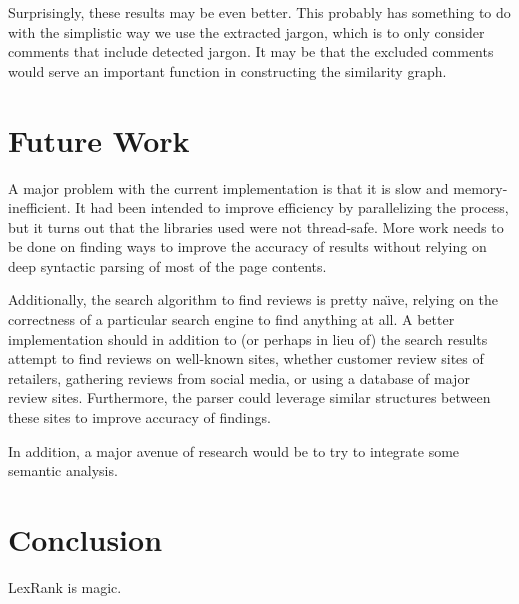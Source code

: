\documentclass{article}
\begin{document}
Surprisingly, these results may be even better. This probably has something to
do with the simplistic way we use the extracted jargon, which is to only
consider comments that include detected jargon. It may be that the excluded
comments would serve an important function in constructing the similarity
graph.

\section{Future Work}

A major problem with the current implementation is that it is slow and memory-
inefficient. It had been intended to improve efficiency by parallelizing the
process, but it turns out that the libraries used were not thread-safe. More
work needs to be done on finding ways to improve the accuracy of results
without relying on deep syntactic parsing of most of the page contents.

Additionally, the search algorithm to find reviews is pretty na\"{\i}ve,
relying on the correctness of a particular search engine to find anything at
all. A better implementation should in addition to (or perhaps in lieu of) the
search results attempt to find reviews on well-known sites, whether customer
review sites of retailers, gathering reviews from social media, or using a
database of major review sites. Furthermore, the parser could leverage similar
structures between these sites to improve accuracy of findings.

In addition, a major avenue of research would be to try to integrate some
semantic analysis.


\section{Conclusion} %

LexRank is magic.




\end{document}
